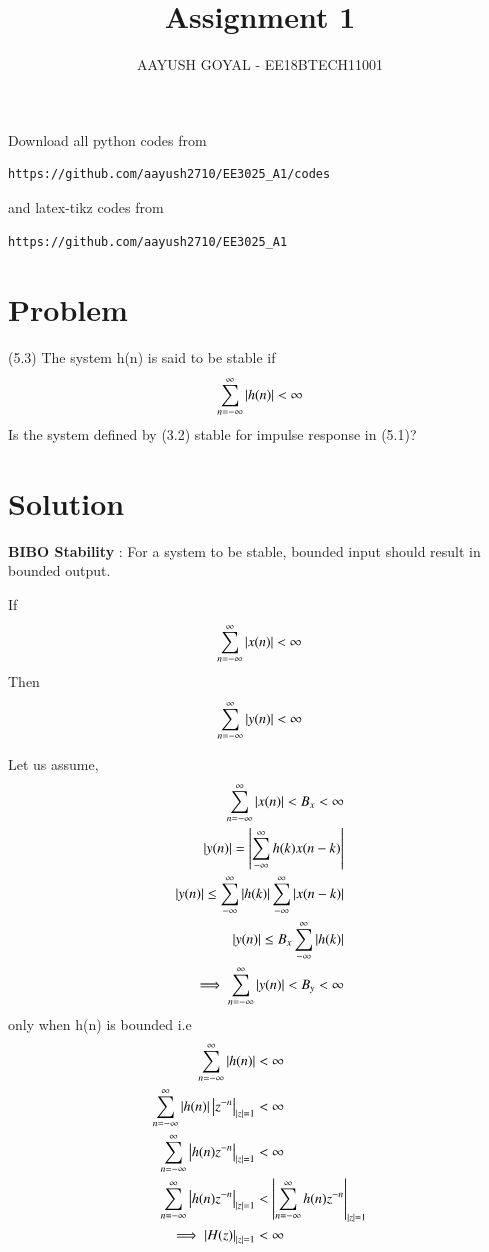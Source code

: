 \documentclass[journal,12pt,twocolumn]{IEEEtran}
\begin{document}
     \def\rightbox#1{\makebox[0in][r]{#1}}
     \def\centbox#1{\makebox[0in]{#1}}
     \def\topbox#1{\raisebox{-\baselineskip}[0in][0in]{#1}}
     \def\midbox#1{\raisebox{-0.5\baselineskip}[0in][0in]{#1}}
\vspace{3cm}
\title{Assignment 1}
\author{AAYUSH GOYAL - EE18BTECH11001}
\maketitle
\newpage
\bigskip
\renewcommand{\thefigure}{\theenumi}
\renewcommand{\thetable}{\theenumi}
Download all python codes from 
\begin{lstlisting}
https://github.com/aayush2710/EE3025_A1/codes
\end{lstlisting}
%
and latex-tikz codes from 
%
\begin{lstlisting}
https://github.com/aayush2710/EE3025_A1
\end{lstlisting}
\section{Problem}
(5.3) The system h(n) is said to be stable if \\
\begin{align}
\sum_{n=-\infty}^{\infty} \left\vert h(n)\right\vert < \infty
\end{align}
Is the system defined by (3.2) stable for impulse response in (5.1)?
\section{Solution}
\textbf{BIBO Stability} : For a system to be stable, bounded input should result in bounded output.


If
\begin{align}
\sum_{n=-\infty}^{\infty} \left\vert x(n)\right\vert < \infty
\end{align}
Then
\begin{align}
\sum_{n=-\infty}^{\infty} \left\vert y(n)\right\vert < \infty
\end{align}

Let us assume,
\begin{align}
\sum_{n=-\infty}^{\infty} \left\vert x(n)\right\vert < B_{x} < \infty \\
\left\vert y(n)\right\vert = \left\vert\sum_{-\infty}^{\infty}h(k)x(n-k)\right\vert \\
\left\vert y(n)\right\vert \leq \sum_{-\infty}^{\infty}\left\vert h(k)\right\vert\sum_{-\infty}^{\infty}\left\vert x(n-k)\right\vert\\
\left\vert y(n)\right\vert \leq B_x\sum_{-\infty}^{\infty}\left\vert h(k)\right\vert\\
\implies \sum_{n=-\infty}^{\infty} \left\vert y(n)\right\vert < B_{y} < \infty
\end{align}
only when h(n) is bounded i.e
\begin{align}
\sum_{n=-\infty}^{\infty} \left\vert h(n)\right\vert  &< \infty \\
\sum_{n=-\infty}^{\infty}\left\vert h(n)\right\vert\left\vert z^{-n}\right\vert_{\left\vert z\right\vert=1}&<\infty\\
\sum_{n=-\infty}^{\infty}\left\vert h(n)z^{-n}\right\vert_{\left\vert z\right\vert=1}&<\infty \\
\sum_{n=-\infty}^{\infty}\left\vert h(n)z^{-n}\right\vert_{\left\vert z\right\vert=1}&<\left\vert\sum_{n=-\infty}^{\infty}h(n)z^{-n}\right\vert_{\left\vert z\right\vert=1} \\
\implies \left\vert H(z)\right\vert_{\left\vert z\right\vert=1}&<\infty
\end{align}
\end{document}
